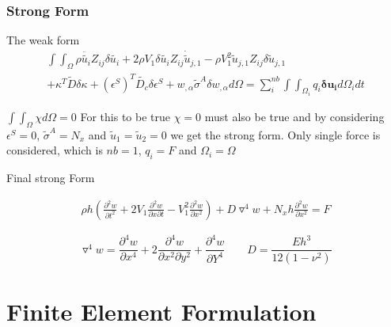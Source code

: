 \documentclass[9pt]{beamer}
\begin{document}
\begin{frame}
\frametitle{Strong Form}
\begin{block}{The weak form}
\begin{equation*}
\begin{split}
 \int \int_\Omega 
\rho \ddot{\tilde{u_i}} Z_{ij} \delta {\tilde{u_i}}
+
2 \rho V_1 \delta {\tilde{u_i}} Z_{ij} \dot{\tilde{u}}_{j,1} 
-
\rho V_1^2 \tilde{u}_{j,1} Z_{ij} \delta \tilde{u}_{j,1}
\\ 
+
\kappa^T \tilde{D} \delta\kappa 
+
\left(\epsilon^S\right)^T \tilde{D_c} \delta\epsilon^S 
+ 
 w_{, \alpha} \tilde{\sigma}^A  \delta w_{, \alpha} d \Omega     
=  
 \sum_i^{nb}   \int  \int_{\Omega_i} q_i \mathbf{\delta u_i}  d \Omega_i dt
\end{split} 
\end{equation*}

\end{block}

$
\int \int_\Omega \chi d\Omega = 0
$
For this to be true
$
 \chi  = 0
$  must also be true and by considering $\epsilon^S=0$, $\tilde{\sigma}^A=N_x$ and $\tilde{u}_1 =\tilde{u}_2 = 0 $ we get the strong  form. 
Only single force is considered, which is $nb=1$, $q_i=F$ and $\Omega_i = \Omega$
\begin{block}{Final strong Form}

\begin{equation*}
\begin{split}
\rho h \left( \frac{\partial ^ 2 w}{\partial t ^ 2 }+2V_1\frac{\partial ^ 2 w}{\partial x \partial t}-V_1^2
\frac{\partial ^ 2 w}{\partial x ^ 2 } \right)  + D  \triangledown ^4 w+ N_xh\frac{\partial ^ 2 w}{\partial x ^ 2 }=F 
\end{split} 
\end{equation*}


\end{block}
\begin{equation*}
\triangledown ^4 w = \frac{\partial ^ 4 w}{\partial x ^ 4 }+2 \frac{\partial ^ 4 w}{\partial x ^ 2 \partial y ^ 2 } + \frac{\partial ^ 4 w}{\partial Y ^ 4 } \qquad D = \frac{Eh^3}{12 \left( 1 - \nu^2 \right) }
\end{equation*}
\end{frame}

\section{Finite Element Formulation}
\end{document}
